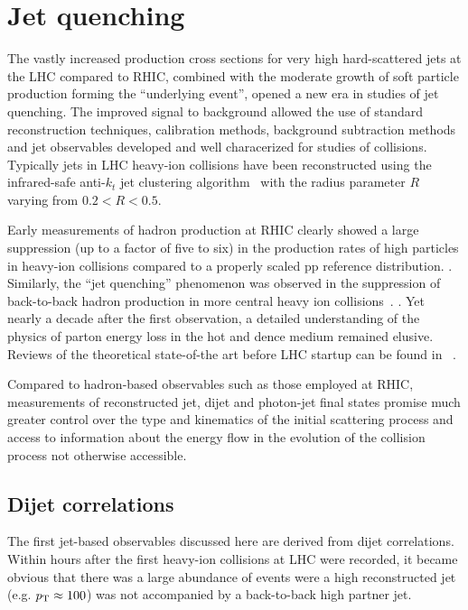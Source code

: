 \section{Jet quenching}
\label{jets_intro}

The vastly increased production cross sections for very high \pT hard-scattered jets at the LHC
compared to RHIC, combined with the moderate growth of soft particle production forming the ``underlying
event'', opened a new era in studies of jet quenching. The improved signal to background allowed the 
use of standard reconstruction techniques, calibration methods, background subtraction methods and 
jet observables developed and well characerized for studies of \pp collisions. 
Typically jets in LHC heavy-ion collisions have been reconstructed using 
the infrared-safe anti-$k_t$ jet clustering algorithm~\cite{Cacciari:2008gp} with the 
radius parameter $R$ varying from $0.2 < R  < 0.5$.

Early measurements of hadron production at RHIC
clearly showed a large suppression (up to a factor of five to six) in the production rates of 
high \pT particles in heavy-ion collisions compared to a properly scaled pp reference distribution. 
\cite{Adcox:2001jp,Adler:2002xw}. Similarly, the ``jet quenching'' phenomenon was observed 
in the suppression of back-to-back hadron production
in more central heavy ion collisions~\cite{Adler:2002xw}. 
\cite{Adcox:2001jp,Adler:2002xw}. Yet nearly a decade after the first observation, a detailed 
understanding of the physics of parton energy loss in the hot and dence medium remained
elusive. Reviews of the theoretical state-of-the art before LHC startup can be 
found in ~\cite{Wiedemann:2009sh,Majumder:2010qh}.

Compared to hadron-based observables such as those employed at RHIC, measurements of reconstructed
jet, dijet and photon-jet final states promise much greater control over the type and kinematics
of the initial scattering process and access to information about the energy flow in the evolution
of the collision process not otherwise accessible. 

\subsection{Dijet correlations}

The first jet-based observables discussed here are derived from dijet correlations. Within hours
after the first heavy-ion collisions at LHC were recorded, it became obvious that there was
a large abundance of events were a high \pT reconstructed jet (e.g. $\mbox{$p_{\mathrm{T}}$} \approx 100$\GeVc) was
not accompanied by a back-to-back high \pT partner jet.

